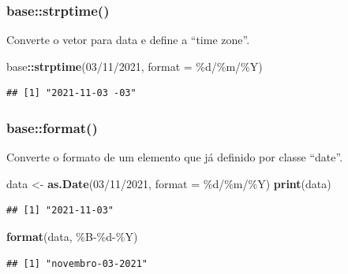 \documentclass[
]{book}
\newenvironment{Shaded}{\begin{snugshade}}{\end{snugshade}}
\newcommand{\AttributeTok}[1]{\textcolor[rgb]{0.13,0.29,0.53}{#1}}
\newcommand{\FunctionTok}[1]{\textcolor[rgb]{0.13,0.29,0.53}{\textbf{#1}}}
\newcommand{\NormalTok}[1]{#1}
\newcommand{\OtherTok}[1]{\textcolor[rgb]{0.56,0.35,0.01}{#1}}
\newcommand{\SpecialCharTok}[1]{\textcolor[rgb]{0.81,0.36,0.00}{\textbf{#1}}}
\newcommand{\StringTok}[1]{\textcolor[rgb]{0.31,0.60,0.02}{#1}}
\theoremstyle{definition}
\theoremstyle{definition}
\theoremstyle{definition}
\theoremstyle{definition}
\theoremstyle{remark}
\begin{document}
\hypertarget{basestrptime}{%
\subsubsection{base::strptime()}\label{basestrptime}}

Converte o vetor para data e define a ``time zone''.

\begin{Shaded}
\begin{Highlighting}[]
\NormalTok{base}\SpecialCharTok{::}\FunctionTok{strptime}\NormalTok{(}\StringTok{\textquotesingle{}03/11/2021\textquotesingle{}}\NormalTok{, }\AttributeTok{format =} \StringTok{\textquotesingle{}\%d/\%m/\%Y\textquotesingle{}}\NormalTok{)}
\end{Highlighting}
\end{Shaded}

\begin{verbatim}
## [1] "2021-11-03 -03"
\end{verbatim}

\hypertarget{baseformat}{%
\subsubsection{base::format()}\label{baseformat}}

Converte o formato de um elemento que já definido por classe ``date''.

\begin{Shaded}
\begin{Highlighting}[]
\NormalTok{data }\OtherTok{\textless{}{-}} \FunctionTok{as.Date}\NormalTok{(}\StringTok{\textquotesingle{}03/11/2021\textquotesingle{}}\NormalTok{, }\AttributeTok{format =} \StringTok{\textquotesingle{}\%d/\%m/\%Y\textquotesingle{}}\NormalTok{)}
\FunctionTok{print}\NormalTok{(data)}
\end{Highlighting}
\end{Shaded}

\begin{verbatim}
## [1] "2021-11-03"
\end{verbatim}

\begin{Shaded}
\begin{Highlighting}[]
\FunctionTok{format}\NormalTok{(data, }\StringTok{\textquotesingle{}\%B{-}\%d{-}\%Y\textquotesingle{}}\NormalTok{)}
\end{Highlighting}
\end{Shaded}

\begin{verbatim}
## [1] "novembro-03-2021"
\end{verbatim}
\end{document}
